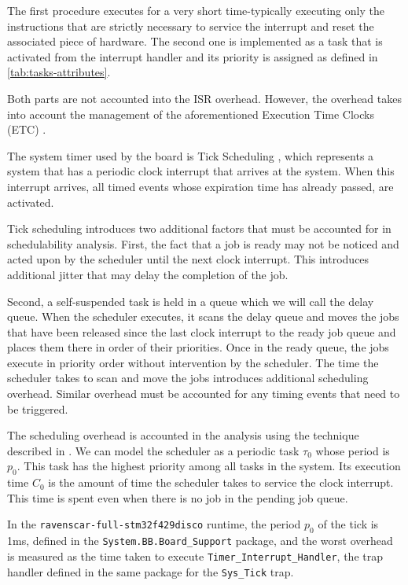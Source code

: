 \documentclass{article}
\begin{document}
The first procedure executes for a very short time-typically executing only the instructions that are strictly necessary to service the interrupt and reset the associated piece of hardware. The second one is implemented as a task that is activated from the interrupt handler and its priority is assigned as defined in \ref{tab:tasks-attributes}.

Both parts are not accounted into the ISR overhead. However, the overhead takes into account the management of the aforementioned Execution Time Clocks (ETC) \cite{etc}.

The system timer used by the board is Tick Scheduling \cite{tick-scheduling}, which represents a system that has a periodic clock interrupt that arrives at the system. When this interrupt arrives, all timed events whose expiration time has already passed, are activated.

Tick scheduling introduces two additional factors that must be accounted for in schedulability analysis. First, the fact that a job is ready may not be noticed and acted upon by the scheduler until the next clock interrupt. This introduces additional jitter that may delay the completion of the job.

Second, a self-suspended task is held in a queue which we will call the delay queue. When the scheduler executes, it scans the delay queue and moves the jobs that have been released since the last clock interrupt to the ready job queue and places them there in order of their priorities. Once in the ready queue, the jobs execute in priority order without intervention by the scheduler. The time the scheduler takes to scan and move the jobs introduces additional scheduling overhead. Similar overhead must be accounted for any timing events that need to be triggered.

The scheduling overhead is accounted in the analysis using the technique described in \cite{effects-runtime}. We can model the scheduler as a periodic task $\tau_0$ whose period is $p_0$. This task has the highest priority among all tasks in the system. Its execution time $C_0$ is the amount of time the scheduler takes to service the clock interrupt. This time is spent even when there is no job in the pending job queue.

In the \texttt{ravenscar-full-stm32f429disco} runtime, the period $p_0$ of the tick is 1ms, defined in the \texttt{System.BB.Board\_Support} package, and the worst overhead is measured as the time taken to execute \texttt{Timer\_Interrupt\_Handler}, the trap handler defined in the same package for the \texttt{Sys\_Tick} trap.
\end{document}
